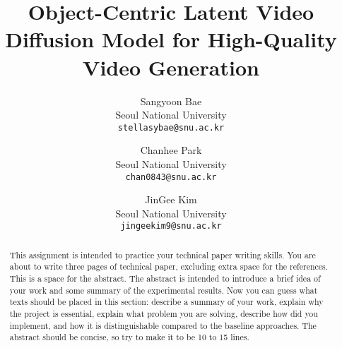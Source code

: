 \documentclass[10pt,twocolumn,letterpaper]{article}
\begin{document}
\title{Object-Centric Latent Video Diffusion Model for High-Quality Video Generation}

\author{Sangyoon Bae\\
Seoul National University\\
{\tt\small stellasybae@snu.ac.kr}
\and
Chanhee Park\\
Seoul National University\\
{\tt\small chan0843@snu.ac.kr}
\and
JinGee Kim\\
Seoul National University\\
{\tt\small jingeekim9@snu.ac.kr}
}

\maketitle

\begin{abstract}
   This assignment is intended to practice your technical paper writing skills. You are about to write three pages of technical paper, excluding extra space for the references. This is a space for the abstract. The abstract is intended to introduce a brief idea of your work and some summary of the experimental results. Now you can guess what texts should be placed in this section: describe a summary of your work, explain why the project is essential, explain what problem you are solving, describe how did you implement, and how it is distinguishable compared to the baseline approaches. The abstract should be concise, so try to make it to be 10 to 15 lines.
\end{abstract}








{\small


}
\end{document}
